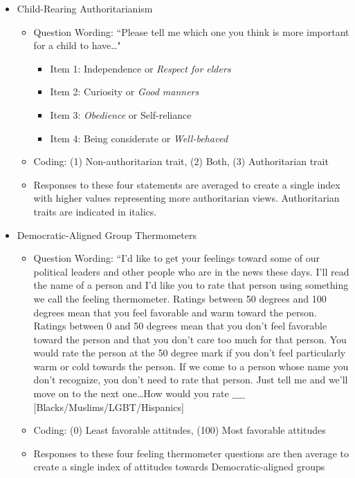 \begin{itemize}
	\item Child-Rearing Authoritarianism
		\begin{itemize}
			\item Question Wording: ``Please tell me which one you think is more important for a child to have\ldots"
			\begin{itemize}
				\item Item 1: Independence or \textit{Respect for elders}
				\item Item 2: Curiosity or \textit{Good manners}
				\item Item 3: \textit{Obedience} or Self-reliance
				\item Item 4: Being considerate or \textit{Well-behaved}
			\end{itemize}
			\item Coding: (1) Non-authoritarian trait, (2) Both, (3) Authoritarian trait
			\item Responses to these four statements are averaged to create a single index with higher values representing more authoritarian views. Authoritarian traits are indicated in italics.
		\end{itemize}
		
		
	\item Democratic-Aligned Group Thermometers
		\begin{itemize}
			\item Question Wording: ``I'd like to get your feelings toward some of our political leaders and other people who are in the news these days. I'll read the name of a person and I'd like you to rate that person using something we call the feeling thermometer. Ratings between 50 degrees and 100 degrees mean that you feel favorable and warm toward the person. Ratings between 0 and 50 degrees mean that you don't feel favorable toward the person and that you don't care too much for that person. You would rate the person at the 50 degree mark if you don't feel particularly warm or cold towards the person. If we come to a person whose name you don't recognize, you don't need to rate that person. Just tell me and we'll move on to the next one\ldots How would you rate $\_\_\_\_$ [Blacks/Muslims/LGBT/Hispanics]
			\item Coding: (0) Least favorable attitudes, (100) Most favorable attitudes
			\item Responses to these four feeling thermometer questions are then average to create a single index of attitudes towards Democratic-aligned groups \parencite{mason2021activating}
		\end{itemize}
						

\end{itemize}
